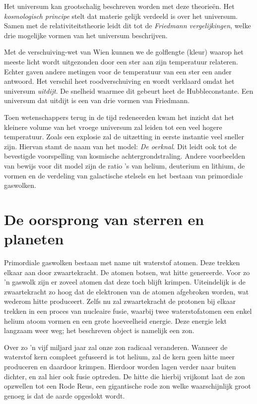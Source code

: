 \documentclass{article}
\begin{document}
        Het universum kan grootschalig beschreven worden met deze theorie\"en. Het \emph{kosmologisch principe} stelt dat materie gelijk verdeeld is over het universum. Samen met de relativiteitstheorie leidt dit tot de \emph{Friedmann vergelijkingen}, welke drie mogelijke vormen van het universum beschrijven.
        
        Met de verschuiving-wet van Wien kunnen we de golflengte (kleur) waarop het meeste licht wordt uitgezonden door een ster aan zijn temperatuur relateren. Echter gaven andere metingen voor de temperatuur van een ster een ander antwoord. Het verschil heet roodverschuiving en wordt verklaard omdat het universum \emph{uitdijt}. De snelheid waarmee dit gebeurt heet de Hubbleconstante. Een universum dat uitdijt is een van drie vormen van Friedmann.
        
        Toen wetenschappers terug in de tijd redeneerden kwam het inzicht dat het kleinere volume van het vroege universum zal leiden tot een veel hogere temperatuur. Zoals een explosie zal de uitzetting in eerste instantie veel sneller zijn. Hiervan stamt de naam van het model: \emph{De oerknal}. Dit leidt ook tot de bevestigde voorspelling van kosmische achtergrondstraling. Andere voorbeelden van bewijs voor dit model zijn de ratio 's van helium, deuterium en lithium, de vormen en de verdeling van galactische stelsels en het bestaan van primordiale gaswolken.
        
    \section{De oorsprong van sterren en planeten}         
        Primordiale gaswolken bestaan met name uit waterstof atomen. Deze trekken elkaar aan door zwaartekracht. De atomen botsen, wat hitte genereerde. Voor zo 'n gaswolk zijn er zoveel atomen dat deze toch blijft krimpen. Uiteindelijk is de zwaartekracht zo hoog dat de elektronen van de atomen afgebroken worden, wat wederom hitte produceert. Zelfs nu zal zwaartekracht de protonen bij elkaar trekken in een proces van nucleaire fusie, waarbij twee waterstofatomen een enkel helium atoom vormen en een grote hoeveelheid energie. Deze energie lekt langzaam weer weg; het beschreven object is namelijk een zon.
        
        Over zo 'n vijf miljard jaar zal onze zon radicaal veranderen. Wanneer de waterstof kern compleet gefuseerd is tot helium, zal de kern geen hitte meer produceren en daardoor krimpen. Hierdoor worden lagen verder naar buiten dichter, en zal hier ook fusie optreden. De hitte die hierbij vrijkomt laat de zon opzwellen tot een Rode Reus, een gigantische rode zon welke waarschijnlijk groot genoeg is dat de aarde opgeslokt wordt.
        
\end{document}
